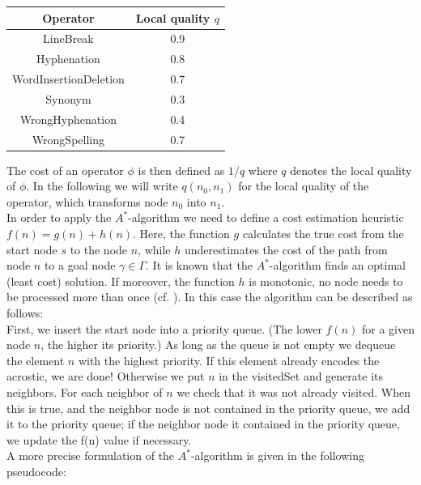 \documentclass[11pt]{reportAlternative}
\begin{document}
\begin{center}

\begin{tabular}{|c|c|}\hline
   Operator           & Local quality $q$ \\ \hline
   LineBreak          & 0.9 \\ \hline
   Hyphenation        & 0.8 \\ \hline
   WordInsertionDeletion    & 0.7 \\ \hline
   Synonym            & 0.3 \\ \hline
   WrongHyphenation   & 0.4 \\ \hline
   WrongSpelling      & 0.7 \\ \hline
\end{tabular}

\end{center}

The cost of an operator $\phi$ is then defined as $1/q$ where $q$ denotes the local quality of $\phi$. In the following we will write $q(n_0,n_1)$ for the local quality of the operator, which transforms node $n_0$ into $n_1$.\\
In order to apply the $A^*$-algorithm we need to define a cost estimation heuristic $f(n)=g(n)+h(n)$. Here, the function $g$ calculates the true cost from the start node $s$ to
the node $n$, while $h$ underestimates the cost of the path from node $n$ to a goal node $\gamma\in\Gamma$. It is known that the $A^*$-algorithm finds an optimal (least cost) solution. If moreover, the function $h$ is monotonic, no node needs to be processed more than once (cf. \cite{AstarAlgorithm}). In this case the algorithm can be described as follows:\\

First, we insert the start node into a priority queue. (The lower $f(n)$ for a given node $n$, the higher its priority.) As long as the queue is not empty we dequeue the element $n$ with the highest priority. If this element already encodes the acrostic, we are done! Otherwise we put $n$ in the
visitedSet and generate its neighbors. For each neighbor of $n$ we check that it was not already visited. When this is true, and the neighbor node is not contained in the priority queue, we add it to the priority queue; if the neighbor node it contained in the priority queue, we update the f(n) value if necessary.\\

A more precise formulation of the $A^*$-algorithm is given in the following pseudocode:\\
\end{document}
